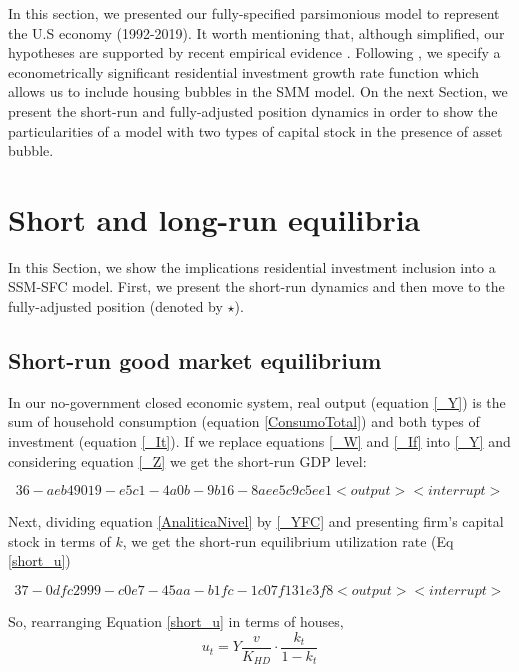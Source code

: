 \documentclass[11pt]{article}
\begin{document}
In this section, we presented our fully-specified parsimonious model to represent the U.S economy (1992-2019). It worth mentioning that, although simplified, our hypotheses are supported by recent empirical evidence \cites{albanesi_credit_2017}. Following \textcites{teixeira_crescimento_2015}{petrini_demanda_2019}, we specify a econometrically significant residential investment growth rate function which allows us to include housing bubbles in the SMM model. On the next Section, we present the short-run and fully-adjusted position dynamics in order to show the particularities of a model with two types of capital stock in the presence of asset bubble.



\section{Short and long-run equilibria}
\label{sec:org5b00c61}
\label{sec:runs}
In this Section, we show the implications residential investment inclusion into a SSM-SFC model. First, we present the short-run dynamics and then move to the fully-adjusted position (denoted by \(\star\)).
\subsection{Short-run good market equilibrium}
\label{sec:org8ded10b}
\label{short}

In our no-government closed economic system, real output (equation \ref{_Y}) is the sum of household consumption (equation \ref{ConsumoTotal}) and both types of investment (equation \ref{_It}). 
If we replace equations \ref{_W} and  \ref{_If} into \ref{_Y} and considering equation \ref{_Z} we get the short-run GDP level:



\begin{equation}
\label{AnaliticaNivel}
36 - aeb49019-e5c1-4a0b-9b16-8aee5c9c5ee1 <output> <interrupt>
\end{equation}

Next, dividing equation \ref{AnaliticaNivel} by \ref{_YFC} and presenting firm's capital stock in terms of \(k\), we get the short-run equilibrium utilization rate (Eq \ref{short_u})


\begin{equation}
\label{short_u}
37 - 0dfc2999-c0e7-45aa-b1fc-1c07f131e3f8 <output> <interrupt>
\end{equation}

So, rearranging Equation \ref{short_u} in terms of houses,
$$
u_{t} = Y\frac{v}{K_{HD}}\cdot \frac{k_{t}}{1-k_{t}}
$$
\end{document}
